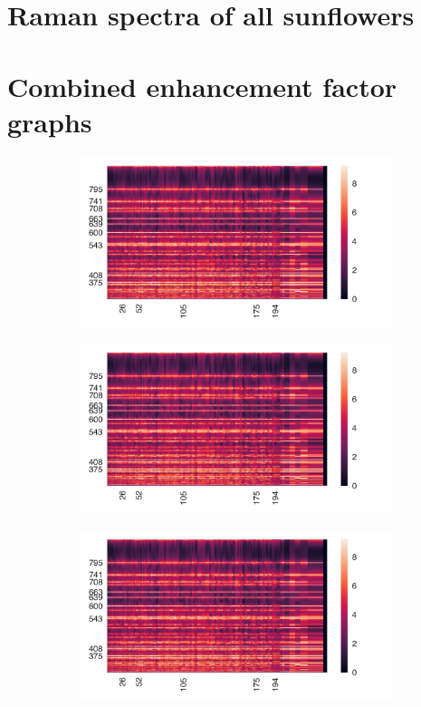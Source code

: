 \documentclass[
	fontsize=10pt, %
	twoside=true, %
	numbers=noenddot, %
]{kaobook}
\begin{document}
\newpage
\section{Raman spectra of all sunflowers}

\newpage
\section{Combined enhancement factor graphs}

\begin{figure}[h]
\centering
\begin{subfigure}{8.25cm}\centering\includegraphics{comb-as12}\end{subfigure}%
\begin{subfigure}{8.25cm}\centering\includegraphics{comb-as12}\end{subfigure}
\begin{subfigure}{8.25cm}\centering\includegraphics{comb-as12}\end{subfigure}%

\end{figure}
\end{document}
